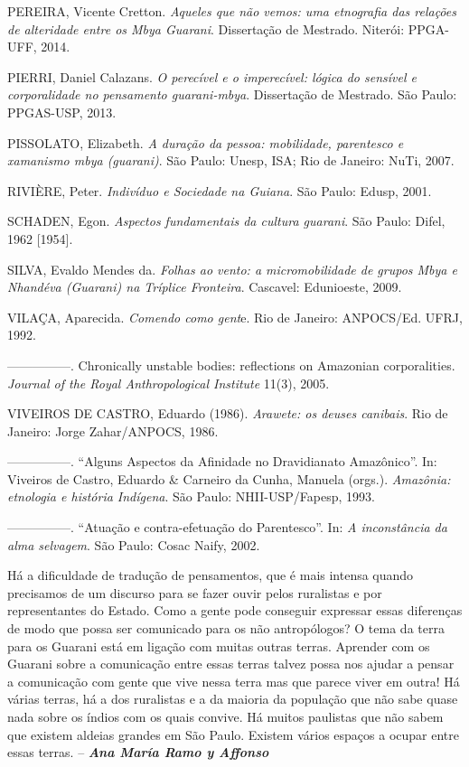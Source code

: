 PEREIRA, Vicente Cretton. \emph{Aqueles que não vemos: uma etnografia
das relações de alteridade entre os Mbya Guarani}. Dissertação de
Mestrado. Niterói: PPGA-UFF, 2014.

PIERRI, Daniel Calazans. \emph{O perecível e o imperecível: lógica do
sensível e corporalidade no pensamento guarani-mbya}. Dissertação de
Mestrado. São Paulo: PPGAS-USP, 2013.

PISSOLATO, Elizabeth. \emph{A duração da pessoa: mobilidade, parentesco
e xamanismo mbya (guarani)}. São Paulo: Unesp, ISA; Rio de Janeiro:
NuTi, 2007.

RIVIÈRE, Peter. \emph{Indivíduo e Sociedade na Guiana}. São Paulo:
Edusp, 2001.

SCHADEN, Egon. \emph{Aspectos fundamentais da cultura guarani}. São
Paulo: Difel, 1962 {[}1954{]}.

SILVA, Evaldo Mendes da. \emph{Folhas ao vento: a micromobilidade de
grupos Mbya e Nhandéva (Guarani) na Tríplice Fronteira}. Cascavel:
Edunioeste, 2009.

VILAÇA, Aparecida. \emph{Comendo como gent}e. Rio de Janeiro: ANPOCS/Ed.
UFRJ, 1992.

---------------. Chronically unstable bodies: reflections on Amazonian
corporalities. \emph{Journal of the Royal Anthropological Institute}
11(3), 2005.

VIVEIROS DE CASTRO, Eduardo (1986). \emph{Arawete: os deuses canibais}.
Rio de Janeiro: Jorge Zahar/ANPOCS, 1986.

---------------. ``Alguns Aspectos da Afinidade no Dravidianato
Amazônico''. In: Viveiros de Castro, Eduardo \& Carneiro da Cunha,
Manuela (orgs.). \emph{Amazônia: etnologia e história Indígena}. São
Paulo: NHII-USP/Fapesp, 1993.

---------------. ``Atuação e contra-efetuação do Parentesco''. In:
\emph{A inconstância da alma selvagem}. São Paulo: Cosac Naify, 2002.

Há a dificuldade de tradução de pensamentos, que é mais intensa quando
precisamos de um discurso para se fazer ouvir pelos ruralistas e por
representantes do Estado. Como a gente pode conseguir expressar essas
diferenças de modo que possa ser comunicado para os não antropólogos? O
tema da terra para os Guarani está em ligação com muitas outras terras.
Aprender com os Guarani sobre a comunicação entre essas terras talvez
possa nos ajudar a pensar a comunicação com gente que vive nessa terra
mas que parece viver em outra! Há várias terras, há a dos ruralistas e a
da maioria da população que não sabe quase nada sobre os índios com os
quais convive. Há muitos paulistas que não sabem que existem aldeias
grandes em São Paulo. Existem vários espaços a ocupar entre essas
terras. -- \emph{\textbf{Ana María Ramo y Affonso}}

